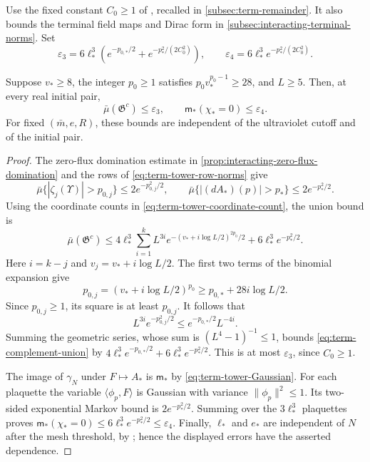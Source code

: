 Use the fixed constant $C_0\ge1$ of
\cite[(25)]{QED3Integration}, recalled in
\cref{subsec:term-remainder}. It also bounds the terminal
field maps and Dirac form in
\cref{subsec:interacting-terminal-norms}. Set
\begin{equation}\label{eq:term-complement-errors}
 \varepsilon_3
 =6\ell_*^3\left(e^{-p_{0,*}/2}
                    +e^{-p_*^2/(2C_0^2)}\right),\qquad
 \varepsilon_4=6\ell_*^3e^{-p_*^2/(2C_0^2)}.
\end{equation}

\begin{proposition}\label{prop:term-complement}
Suppose $v_*\ge8$, the integer $p_0\ge1$ satisfies
$p_0v_*^{p_0-1}\ge28$, and $L\ge5$. Then, at every
real initial pair,
\begin{equation}\label{eq:term-complement-bound}
 \bar\mu(\mathfrak G^c)\le\varepsilon_3,\qquad
             \mathsf m_*(\chi_*=0)\le\varepsilon_4.
\end{equation}
For fixed $(\bar m,e,R)$, these bounds are independent
of the ultraviolet cutoff and of the initial pair.
\end{proposition}

\begin{proof}
The zero-flux domination estimate in
\cref{prop:interacting-zero-flux-domination}
and the rows of \eqref{eq:term-tower-row-norms} give
\[
 \bar\mu\{|\zeta_j(\Upsilon)|>p_{0,j}\}
                   \le2e^{-p_{0,j}^2/2},\qquad
 \bar\mu\{|(dA_*)(p)|>p_*\}\le2e^{-p_*^2/2}.
\]
Using the coordinate counts in
\eqref{eq:term-tower-coordinate-count}, the union bound is
\begin{equation}\label{eq:term-complement-union}
 \bar\mu(\mathfrak G^c)
 \le4\ell_*^3\sum_{i=1}^{k}L^{3i}
                  e^{-(v_*+i\log L/2)^{2p_0}/2}
                +6\ell_*^3e^{-p_*^2/2}.
\end{equation}
Here $i=k-j$ and $v_j=v_*+i\log L/2$.
The first two terms of the binomial expansion give
\[
 p_{0,j}=(v_*+i\log L/2)^{p_0}
       \ge p_{0,*}+28i\log L/2.
\]
Since $p_{0,j}\ge1$, its square is at least $p_{0,j}$.
It follows that
\[
 L^{3i}e^{-p_{0,j}^2/2}
                  \le e^{-p_{0,*}/2}L^{-4i}.
\]
Summing the geometric series, whose sum is
$(L^4-1)^{-1}\le1$, bounds
\eqref{eq:term-complement-union} by
$4\ell_*^3e^{-p_{0,*}/2}+6\ell_*^3e^{-p_*^2/2}$.
This is at most $\varepsilon_3$, since $C_0\ge1$.

The image of $\gamma_N$ under $F\mapsto A_*$ is
$\mathsf m_*$ by \eqref{eq:term-tower-Gaussian}.
For each plaquette the variable
$\langle\phi_p,F\rangle$ is Gaussian with variance
$\|\phi_p\|^2\le1$. Its two-sided exponential Markov
bound is $2e^{-p_*^2/2}$.
Summing over the $3\ell_*^3$ plaquettes proves
$\mathsf m_*(\chi_*=0)\le6\ell_*^3e^{-p_*^2/2}
\le\varepsilon_4$.
Finally, $\ell_*$ and $e_*$ are independent of $N$
after the mesh threshold, by
\cite[Proposition~6.1]{CoverTuning}; hence the displayed
errors have the asserted dependence.
\end{proof}

